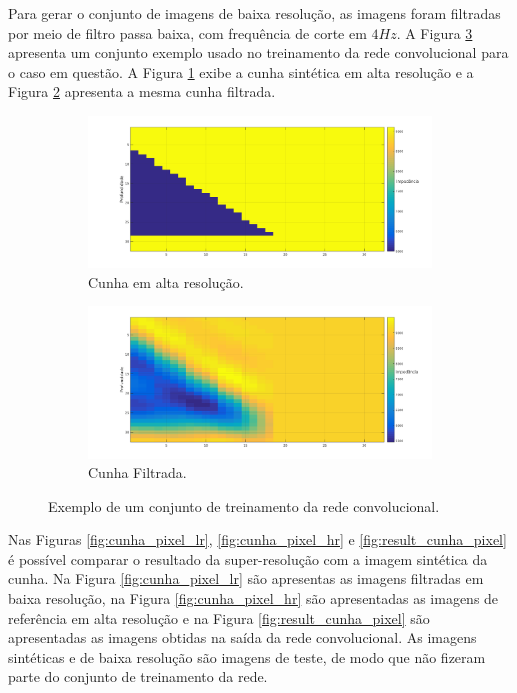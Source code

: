 Para gerar o conjunto de imagens de baixa resolução, as imagens foram filtradas por meio de filtro
passa baixa, com frequência de corte em $4Hz$. A Figura \ref{fig:cunhas} apresenta um conjunto exemplo
usado no treinamento da rede convolucional para o caso em questão. A Figura \ref{fig:cunhahr} exibe
a cunha sintética em alta resolução e a Figura \ref{fig:cunhalr} apresenta a mesma cunha filtrada.
\begin{figure}[htp]
\centering
\begin{subfigure}{.8\textwidth}
  \includegraphics[width=.9\linewidth]{fig/cunha_hr}
  \caption{Cunha em alta resolução.}
  \label{fig:cunhahr}
\end{subfigure}
\begin{subfigure}{.8\textwidth}
  \includegraphics[width=.9\linewidth]{fig/cunha_lr}
  \caption{Cunha Filtrada.}
  \label{fig:cunhalr}
\end{subfigure}%
\caption{Exemplo de um conjunto de treinamento da rede convolucional.}
\label{fig:cunhas}
\end{figure}

Nas Figuras \ref{fig:cunha_pixel_lr}, \ref{fig:cunha_pixel_hr} e \ref{fig:result_cunha_pixel} é possível comparar
o resultado da super-resolução com a imagem sintética da cunha. Na Figura \ref{fig:cunha_pixel_lr} são apresentas as imagens filtradas em
baixa resolução, na Figura \ref{fig:cunha_pixel_hr} são apresentadas as imagens de referência em alta resolução e na 
Figura \ref{fig:result_cunha_pixel} são apresentadas as imagens obtidas na saída da rede convolucional.
As imagens sintéticas e de baixa resolução são imagens de teste, de modo que não fizeram parte do conjunto de treinamento
da rede.

